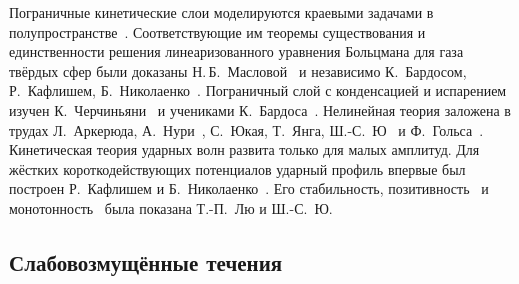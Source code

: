 Пограничные кинетические слои моделируются краевыми задачами в полупространстве~\cite{Grad1969}.
Соответствующие им теоремы существования и единственности решения линеаризованного уравнения Больцмана для газа твёрдых сфер
были доказаны Н.\,Б.~Масловой~\cite{Maslova1982} и независимо К.~Бардосом, Р.~Кафлишем, Б.~Николаенко~\cite{Bardos1986}.
Пограничный слой с конденсацией и испарением изучен К.~Черчиньяни~\cite{Cercignani1986}
и учениками К.~Бардоса~\cite{Coron1988}.
Нелинейная теория заложена в трудах Л.~Аркерюда, А.~Нури~\cite{Arkeryd2000},
С.~Юкая, Т.~Янга, Ш.-С.~Ю~\cite{Ukai2003} и Ф.~Гольса~\cite{Golse2008}.
Кинетическая теория ударных волн развита только для малых амплитуд.
Для жёстких короткодействующих потенциалов ударный профиль впервые был построен Р.~Кафлишем и Б.~Николаенко~\cite{Caflisch1982}.
Его стабильность, позитивность~\cite{Liu2004} и монотонность~\cite{Liu2013} была показана Т.-П.~Лю и Ш.-С.~Ю. %

\subsection{Слабовозмущённые течения}

